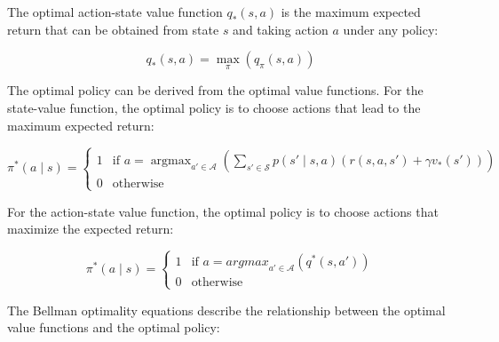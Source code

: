 The optimal action-state value function $q_*(s,a)$ is the maximum expected return that can be obtained from state $s$ and taking action $a$ under any policy:

\begin{equation}
q_*(s,a) = \max_{\pi} (q_{\pi}(s,a))
\end{equation}

The optimal policy can be derived from the optimal value functions. For the state-value function, the optimal policy is to choose actions that 
lead to the maximum expected return:

\begin{equation}
    \pi^*(a \mid s) = 
    \begin{cases}
        1 & \text{if } a = \operatorname{argmax}_{a' \in \mathcal{A}} \left(\sum_{s' \in \mathcal{S}} p(s' \mid s,a) \left(r(s,a,s') + \gamma v_*(s')\right)\right) \\
        0 & \text{otherwise}
    \end{cases}
\end{equation}

For the action-state value function, the optimal policy is to choose actions that maximize the expected return:

\begin{equation}
\pi^*(a \mid s) = \begin{cases}
1 & \text{if } a = {argmax}_{a' \in \mathcal{A}} \left( q^*(s,a') \right) \\
0 & \text{otherwise}
\end{cases}
\end{equation}

The Bellman optimality equations describe the relationship between the optimal value functions and the optimal policy:

